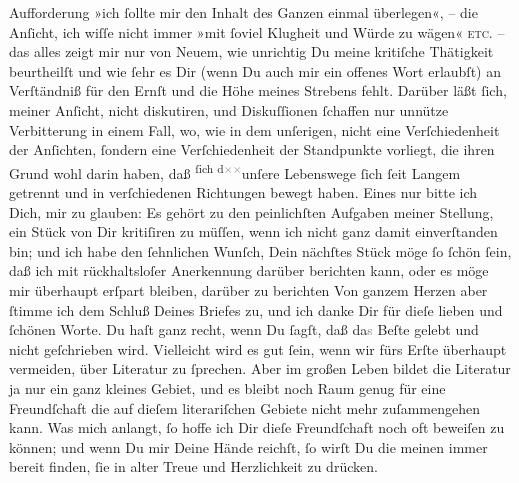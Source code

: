 \begin{ledgroupsized}[t]{13cm}
               Aufforderung »ich ſollte  mir den Inhalt des Ganzen
               einmal überlegen«, – die Anſicht, ich wiſſe nicht immer »mit ſoviel Klugheit und
               Würde zu wägen« \textsc{etc.} – das alles zeigt mir nur von Neuem,
               wie unrichtig Du  meine kritiſche Thätigkeit
               beurtheilſt und \strikeout{\textcolor{gray}{mit}} wie ſehr es Dir (wenn Du auch mir ein offenes Wort erlaubſt) an Verſtändniß
               für den Ernſt und die Höhe meines Strebens fehlt. Darüber läßt ſich, meiner Anſicht,
               nicht diskutiren, und Diskuſſionen ſchaffen nur 
               unnütze Verbitterung in einem Fall, wo, wie in dem {\pb}unſerigen, nicht eine Verſchiedenheit der Anſichten, ſondern eine Verſchiedenheit
               der Standpunkte vorliegt, die ihren Grund wohl darin haben, daß \substVorne{}\textsuperscript{ſich d\textcolor{gray}{×}\-\textcolor{gray}{×}}{\allowbreak}\substDazwischen{}unſere\substHinten{} Lebenswege ſich ſeit Langem getrennt und in verſchiedenen Richtungen bewegt
               haben.\pend
           \pstart
           Eines nur bitte ich Dich, mir zu glauben: Es gehört zu den peinlichſten Aufgaben
               meiner Stellung, ein Stück von Dir \strikeout{\textcolor{gray}{×}} kritiſiren zu müſſen, wenn ich nicht ganz damit einverſtanden bin; und ich
               habe den ſehnlichen Wunſch, Dein nächſtes Stück möge ſo ſchön ſein, daß ich mit
               rückhaltsloſer Anerkennung darüber berichten kann, oder es \strikeout{\textcolor{gray}{×}} möge mir überhaupt erſpart bleiben, darüber zu berichten{\dotsfive}\pend
           \pstart
           Von ganzem Herzen  aber ſtimme ich dem Schluß Deines Briefes zu, und ich danke Dir für dieſe
               lieben {\pb}und ſchönen Worte. Du haſt ganz recht, wenn
               Du ſagſt, daß da\textcolor{gray}{s} Beſte gelebt und nicht geſchrieben wird.
               Vielleicht wird es gut ſein, wenn wir fürs Erſte überhaupt vermeiden, über Literatur
               zu ſprechen. Aber im großen Leben bildet die Literatur ja nur ein ganz kleines
               Gebiet, und es bleibt noch Raum genug für eine Freundſchaft die auf dieſem
               literariſchen Gebiete nicht mehr zuſammengehen kann. Was mich anlangt, ſo hoffe ich
               Dir dieſe Freundſchaft noch oft beweiſen zu können; und  wenn Du mir Deine Hände reichſt, ſo wirſt Du die meinen immer bereit
               finden, ſie \strikeout{\textcolor{gray}{×}\-\textcolor{gray}{×}\-\textcolor{gray}{×}} in alter Treue und Herzlichkeit zu drücken.\pend

\end{ledgroupsized}
